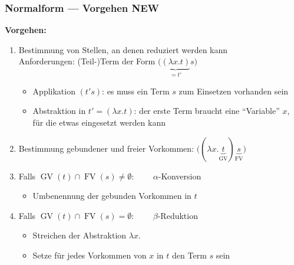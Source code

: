 \documentclass{beamer}
\DeclareMathOperator{\GV}{GV}
\DeclareMathOperator{\FV}{FV}
\begin{document}
\begin{frame} \frametitle{Normalform --- Vorgehen \hfill \alert{\small NEW}}
	\footnotesize
	\textbf{Vorgehen:}
	\begin{enumerate}
		\item Bestimmung von Stellen, an denen reduziert werden kann \\
		Anforderungen: (Teil-)Term der Form $\big( \underbrace{(\lambda x . t)}_{= t'} s \big)$
		\begin{itemize} \footnotesize
			\item Applikation $(t' s)$: es muss ein Term $s$ zum Einsetzen vorhanden sein
			\item Abstraktion in $t' = (\lambda x . t)$: der erste Term braucht eine \enquote{Variable} $x$, für die etwas eingesetzt werden kann
		\end{itemize} \pause
		\item Bestimmung gebundener und freier Vorkommen: $\big( (\lambda x . \underbrace{t}_{\GV}) \underbrace{s}_{\FV} \big)$
		\pause
		\item Falls $\GV(t) \cap \FV(s) \neq \emptyset$: $\qquad \alpha$-Konversion
		\begin{itemize} \footnotesize
			\item Umbenennung der gebunden Vorkommen in $t$
		\end{itemize}
		\item Falls $\GV(t) \cap \FV(s) = \emptyset$: $\qquad \beta$-Reduktion
		\begin{itemize} \footnotesize
			\item Streichen der Abstraktion $\lambda x.$
			\item Setze für jedes Vorkommen von $x$ in $t$ den Term $s$ sein
		\end{itemize}
	\end{enumerate}
\end{frame}
\end{document}
